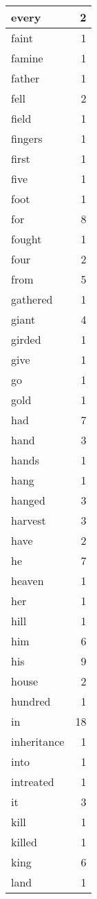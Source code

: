 \begin{center}
\begin{longtable}{l|r}
every & 2 \\ \hline
faint & 1 \\ \hline
famine & 1 \\ \hline
father & 1 \\ \hline
fell & 2 \\ \hline
field & 1 \\ \hline
fingers & 1 \\ \hline
first & 1 \\ \hline
five & 1 \\ \hline
foot & 1 \\ \hline
for & 8 \\ \hline
fought & 1 \\ \hline
four & 2 \\ \hline
from & 5 \\ \hline
gathered & 1 \\ \hline
giant & 4 \\ \hline
girded & 1 \\ \hline
give & 1 \\ \hline
go & 1 \\ \hline
gold & 1 \\ \hline
had & 7 \\ \hline
hand & 3 \\ \hline
hands & 1 \\ \hline
hang & 1 \\ \hline
hanged & 3 \\ \hline
harvest & 3 \\ \hline
have & 2 \\ \hline
he & 7 \\ \hline
heaven & 1 \\ \hline
her & 1 \\ \hline
hill & 1 \\ \hline
him & 6 \\ \hline
his & 9 \\ \hline
house & 2 \\ \hline
hundred & 1 \\ \hline
in & 18 \\ \hline
inheritance & 1 \\ \hline
into & 1 \\ \hline
intreated & 1 \\ \hline
it & 3 \\ \hline
kill & 1 \\ \hline
killed & 1 \\ \hline
king & 6 \\ \hline
land & 1 \\ \hline

\end{longtable}
\end{center}

